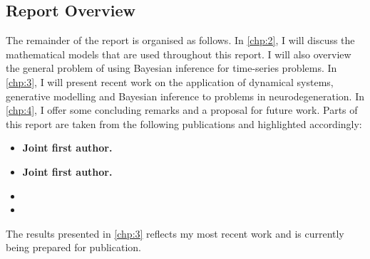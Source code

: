 \subsection{Report Overview}
The remainder of the report is organised as follows. In \cref{chp:2}, I
will discuss the mathematical models that are used throughout this report. I
will also overview the general problem of using Bayesian inference for
time-series problems. In \cref{chp:3}, I will present recent work on the
application of dynamical systems, generative modelling and Bayesian inference to
problems in neurodegeneration. In \cref{chp:4}, I offer some concluding
remarks and a proposal for future work.
Parts of this report are taken from the following publications and highlighted
accordingly: 
\begin{itemize}
    \item {} \textbf{Joint first author.}
    \item {} \textbf{Joint first author.}
    \item {}
    \item {}
\end{itemize}
The results presented in \cref{chp:3} reflects my most recent work 
and is currently being prepared for publication.

